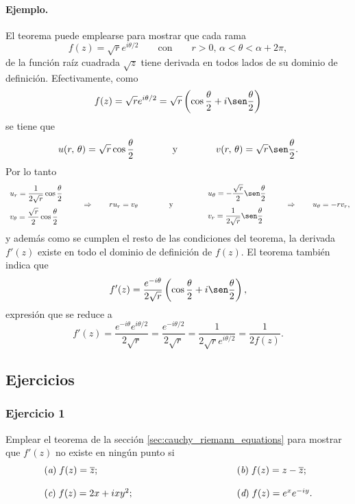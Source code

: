 \documentclass[a4paper]{report}
\begin{document}
\paragraph{Ejemplo.} El teorema puede emplearse para mostrar que cada rama
\[
 f(z)=\sqrt{r}e^{i\theta/2}\qquad\textrm{con}\qquad r>0,\,\alpha<\theta<\alpha+2\pi,
\]
de la función raíz cuadrada \(\sqrt{z}\) tiene derivada en todos lados de su dominio de definición. Efectivamente, como
\[
 f(z)=\sqrt{r}e^{i\theta/2}=\sqrt{r}\left(\cos\frac{\theta}{2}+i\sen\frac{\theta}{2}\right)
\]
se tiene que 
\[
 u(r,\,\theta)=\sqrt{r}\cos\frac{\theta}{2}
  \qquad\qquad\textrm{y}\qquad\qquad
 v(r,\,\theta)=\sqrt{r}\sen\frac{\theta}{2}.
\]
Por lo tanto
\[
 \begin{array}{l}
  u_r=\dfrac{1}{2\sqrt{r}}\cos\dfrac{\theta}{2}\\[\bigskipamount]
  v_\theta=\dfrac{\sqrt{r}}{2}\cos\dfrac{\theta}{2}
 \end{array}
 \qquad\Rightarrow\qquad
 ru_r=v_\theta
 \qquad\qquad\textrm{y}\qquad\qquad
 \begin{array}{l}
  u_\theta=-\dfrac{\sqrt{r}}{2}\sen\dfrac{\theta}{2}\\[\bigskipamount]
  v_r=\dfrac{1}{2\sqrt{r}}\sen\dfrac{\theta}{2}
 \end{array}
 \qquad\Rightarrow\qquad
 u_\theta=-rv_r,
\]
y además como se cumplen el resto de las condiciones del teorema, la derivada \(f'(z)\) existe en todo el dominio de definición de \(f(z)\). El teorema también indica que 
\[
 f'(z)=\frac{e^{-i\theta}}{2\sqrt{r}}\left(\cos\frac{\theta}{2}+i\sen\frac{\theta}{2}\right),
\]
expresión que se reduce a 
\[
 f'(z)=\frac{e^{-i\theta}e^{i\theta/2}}{2\sqrt{r}}
  =\frac{e^{-i\theta/2}}{2\sqrt{r}}
  =\frac{1}{2\sqrt{r}e^{i\theta/2}}
  =\frac{1}{2f(z)}.
\]

\subsection*{Ejercicios}

\subsubsection{Ejercicio 1}

Emplear el teorema de la sección \ref{sec:cauchy_riemann_equations} para mostrar que \(f'(z)\) no existe en ningún punto si
\[
 \begin{array}{ll}
  (\textit{a})\;f(z)=\overline{z};\qquad\qquad\qquad\qquad\qquad&(\textit{b})\;f(z)=z-\overline{z};\\[\bigskipamount]
  (\textit{c})\;f(z)=2x+ixy^2;\qquad\qquad\qquad\qquad\qquad&(\textit{d})\;f(z)=e^xe^{-iy}.
 \end{array}
\]
\end{document}
